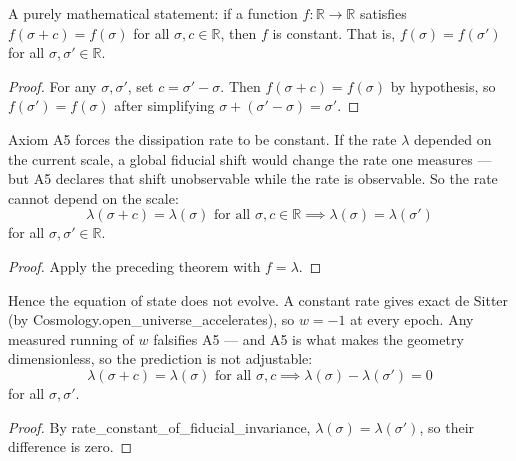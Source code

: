 \begin{theorem}
A purely mathematical statement: if a function $f : \mathbb{R} \to \mathbb{R}$ satisfies $f(\sigma + c) = f(\sigma)$ for all $\sigma, c \in \mathbb{R}$, then $f$ is constant.  That is, $f(\sigma) = f(\sigma')$ for all $\sigma, \sigma' \in \mathbb{R}$.
\begin{proof}
For any $\sigma, \sigma'$, set $c = \sigma' - \sigma$. Then $f(\sigma + c) = f(\sigma)$ by hypothesis, so $f(\sigma') = f(\sigma)$ after simplifying $\sigma + (\sigma' - \sigma) = \sigma'$.
\end{proof}
\end{theorem}

\begin{theorem}
Axiom A5 forces the dissipation rate to be constant.  If the rate $\lambda$ depended on the current scale, a global fiducial shift would change the rate one measures — but A5 declares that shift unobservable while the rate is observable.  So the rate cannot depend on the scale:
\begin{equation}
\lambda(\sigma + c) = \lambda(\sigma) \text{ for all } \sigma, c \in \mathbb{R} \implies \lambda(\sigma) = \lambda(\sigma')
\end{equation}
for all $\sigma, \sigma' \in \mathbb{R}$.
\begin{proof}
Apply the preceding theorem with $f = \lambda$.
\end{proof}
\end{theorem}

\begin{theorem}
Hence the equation of state does not evolve.  A constant rate gives exact de Sitter (by Cosmology.open\_universe\_accelerates), so $w = -1$ at every epoch.  Any measured running of $w$ falsifies A5 — and A5 is what makes the geometry dimensionless, so the prediction is not adjustable:
\begin{equation}
\lambda(\sigma + c) = \lambda(\sigma) \text{ for all } \sigma, c \implies \lambda(\sigma) - \lambda(\sigma') = 0
\end{equation}
for all $\sigma, \sigma'$.
\begin{proof}
By rate\_constant\_of\_fiducial\_invariance, $\lambda(\sigma) = \lambda(\sigma')$, so their difference is zero.
\end{proof}
\end{theorem}

